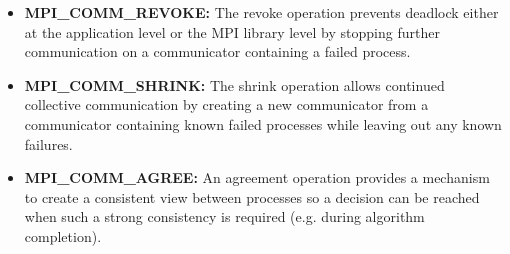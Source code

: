 \begin{itemize}
    \item {\bf MPI\_COMM\_REVOKE:} The revoke operation prevents deadlock either at the application level or the MPI library level by stopping further communication on a communicator containing a failed process.
    \item {\bf MPI\_COMM\_SHRINK:} The shrink operation allows continued collective communication by creating a new communicator from a communicator containing known failed processes while leaving out any known failures.
    \item {\bf MPI\_COMM\_AGREE:} An agreement operation provides a mechanism to create a consistent view between processes so a decision can be reached when such a strong consistency is required (e.g. during algorithm completion).
\end{itemize}

